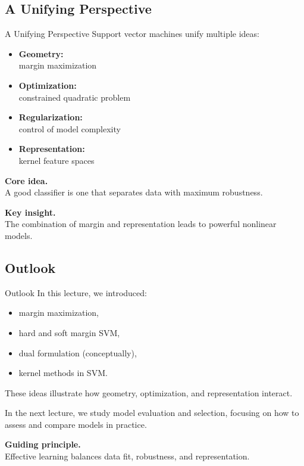 \documentclass[aspectratio=169,11pt]{beamer}
\begin{document}
\subsection{A Unifying Perspective}
\begin{frame}[t,allowframebreaks]{A Unifying Perspective}
\small
Support vector machines unify multiple ideas:

\begin{itemize}
    \item \textbf{Geometry:}\\ margin maximization
    \item \textbf{Optimization:}\\ constrained quadratic problem
    \item \textbf{Regularization:}\\ control of model complexity
    \item \textbf{Representation:}\\ kernel feature spaces
\end{itemize}

\textbf{Core idea.}\\ A good classifier is one that separates data with maximum robustness.

\textbf{Key insight.}\\ The combination of margin and representation leads to powerful nonlinear models.
\end{frame}

\subsection{Outlook}
\begin{frame}[t,allowframebreaks]{Outlook}
\small
In this lecture, we introduced:

\begin{itemize}
    \item margin maximization,
    \item hard and soft margin SVM,
    \item dual formulation (conceptually),
    \item kernel methods in SVM.
\end{itemize}

These ideas illustrate how geometry, optimization, and representation interact.

In the next lecture, we study model evaluation and selection, focusing on how to assess and compare models in practice.

\textbf{Guiding principle.}\\ Effective learning balances data fit, robustness, and representation.
\end{frame}
\end{document}
